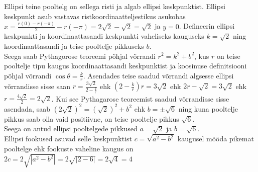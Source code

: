 \documentclass{article}
\begin{document}
Ellipsi teine pooltelg on sellega risti ja algab ellipsi keskpunktist. Ellipsi keskpunkt asub vastavas ristkoordinaatteljestikus asukohas $x=\frac{r(0)-r(-\pi)}2-r(-\pi)=2\sqrt2-\sqrt2=\sqrt2$ ja $y=0$. Defineerin ellipsi keskpunkti ja koordinaattasandi keskpunkti vaheliseks kauguseks $k=\sqrt2$ ning koordinaattasandi ja teise pooltelje pikkuseks $b$.\\
Seega saab Pythagorose teoreemi põhjal võrrandi $r^2=k^2+b^2$, kus $r$ on teise pooltelje tipu kaugus koordinaattasandi keskpunktist ja koosinuse definitsiooni põhjal võrrandi $\cos\theta=\frac k r$. Asendades teise saadud võrrandi algsesse ellipsi võrrandisse sisse saan $r=\frac{3\sqrt2}{2-\frac k r}$ ehk $(2-\frac k r)r=3\sqrt2$ ehk $2r-\sqrt2=3\sqrt2$ ehk $r=\frac{4\sqrt{2}}{2}=2\sqrt2$. Kui see Pythagarose teoreemist saadud võrrandisse sisse asendada, saab $(2\sqrt2)^2=(\sqrt2)^2+b^2$ ehk $b=\pm\sqrt6$ ning kuna pooltelje pikkus saab olla vaid positiivne, on teise pooltelje pikkus $\sqrt6$.\\
Seega on antud ellipsi pooltelgede pikkused $a=\sqrt2$ ja $b=\sqrt6$.\\
Ellipsi fookused asuvad selle keskpunktist $c=\sqrt{a^2-b^2}$ kaugusel mööda pikemat pooltelge ehk fookuste vaheline kaugus on\\
$2c=2\sqrt{|a^2-b^2|}=2\sqrt{|2-6|}=2\sqrt{4}=4$
\end{document}
